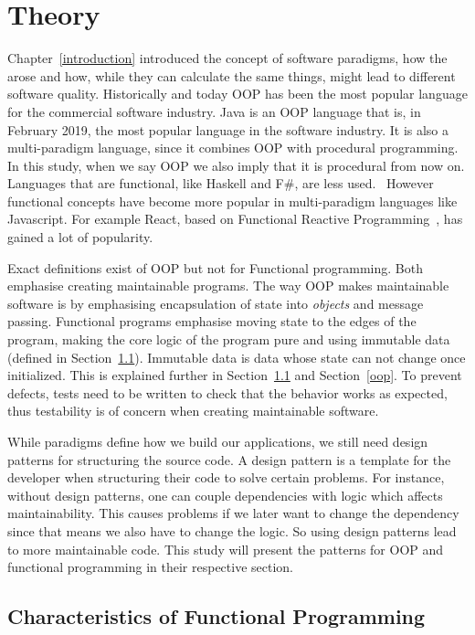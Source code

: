 \chapter{Theory}\label{theory} 

Chapter~\ref{introduction} introduced the concept of software paradigms, how the
arose and how, while they can calculate the same things, might lead to different
software quality. Historically and today OOP has been the most popular language
for the commercial software industry. Java is an OOP language that is, in
February 2019, the most popular language in the software industry. It is also a
multi-paradigm language, since it combines OOP with procedural programming. In
this study, when we say OOP we also imply that it is procedural from now on.
Languages that are functional, like Haskell and F\#, are less used.~\cite{tiobe}
However functional concepts have become more popular in multi-paradigm languages
like Javascript. For example React, based on Functional Reactive
Programming~\cite{reactisfrp}, has gained a lot of
popularity.~\cite{popularityreact} 

Exact definitions exist of OOP but not for Functional programming. Both
emphasise creating maintainable programs.  The way OOP makes maintainable
software is by emphasising encapsulation of state into \textit{objects} and
message passing. Functional programs emphasise moving state to the edges of the
program, making the core logic of the program pure and using immutable data
(defined in Section~\ref{functionalprogramming}). Immutable data is data whose
state can not change once initialized. This is explained further in
Section~\ref{functionalprogramming} and Section~\ref{oop}. To prevent defects,
tests need to be written to check that the behavior works as expected, thus
testability is of concern when creating maintainable software.

While paradigms define how we build our applications, we still need design
patterns for structuring the source code. A design pattern is a template for the
developer when structuring their code to solve certain problems. For instance,
without design patterns, one can couple dependencies with logic which affects
maintainability. This causes problems if we later want to change the dependency
since that means we also have to change the logic. So using design patterns lead
to more maintainable code. This study will present the patterns for OOP and
functional programming in their respective section. 

\section{Characteristics of Functional Programming}\label{functionalprogramming}

